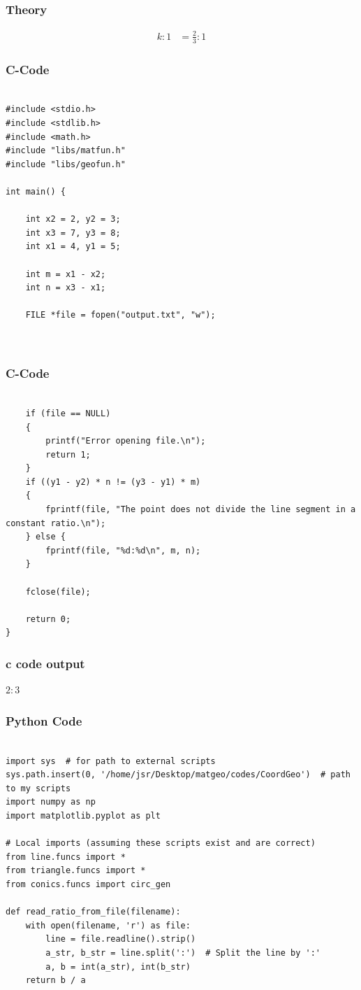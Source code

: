 \documentclass{beamer}
\begin{document}
\begin{frame}
\frametitle{Theory}
\begin{align}   
k\colon1&=\frac{2}{3}\colon1
\end{align}
\end{frame}

\begin{frame}[fragile]
\frametitle{C-Code}
\begin{verbatim}

#include <stdio.h>
#include <stdlib.h>
#include <math.h>
#include "libs/matfun.h"
#include "libs/geofun.h"

int main() {

    int x2 = 2, y2 = 3;
    int x3 = 7, y3 = 8;
    int x1 = 4, y1 = 5;

    int m = x1 - x2; 
    int n = x3 - x1; 

    FILE *file = fopen("output.txt", "w");

    
\end{verbatim}
\end{frame}
\begin{frame}[fragile]
\frametitle{C-Code}
\begin{verbatim}

    if (file == NULL) 
    {
        printf("Error opening file.\n");
        return 1;
    }
    if ((y1 - y2) * n != (y3 - y1) * m) 
    {
        fprintf(file, "The point does not divide the line segment in a constant ratio.\n");
    } else {
        fprintf(file, "%d:%d\n", m, n);
    }

    fclose(file);

    return 0;
}
\end{verbatim}
\end{frame}
\begin{frame}
\frametitle{c code output}
$2:3$
\end{frame}
\begin{frame}[fragile]
  \frametitle{Python Code }

\begin{verbatim}

import sys  # for path to external scripts
sys.path.insert(0, '/home/jsr/Desktop/matgeo/codes/CoordGeo')  # path to my scripts
import numpy as np
import matplotlib.pyplot as plt

# Local imports (assuming these scripts exist and are correct)
from line.funcs import *
from triangle.funcs import *
from conics.funcs import circ_gen

def read_ratio_from_file(filename):
    with open(filename, 'r') as file:
        line = file.readline().strip() 
        a_str, b_str = line.split(':')  # Split the line by ':'
        a, b = int(a_str), int(b_str)   
    return b / a  
\end{verbatim}
\end{frame}
\end{document}
